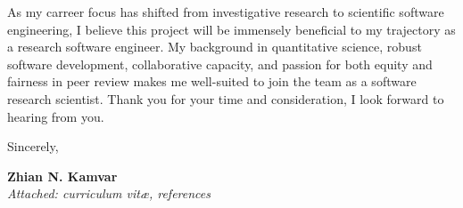 \vspace{1ex}

As my carreer focus has shifted from investigative research to scientific
software engineering, I believe this project will be immensely beneficial to my
trajectory as a research software engineer. My background in quantitative
science, robust software development, collaborative capacity, and passion for
both equity and fairness in peer review makes me well-suited to join the team
as a software research scientist. Thank you for your time and consideration, I
look forward to hearing from you. 

\vspace{2ex}

Sincerely,

\vspace{5ex}

\textbf{Zhian N. Kamvar}\\
\textit{Attached: curriculum vit\ae{}, references}
\clearpage






